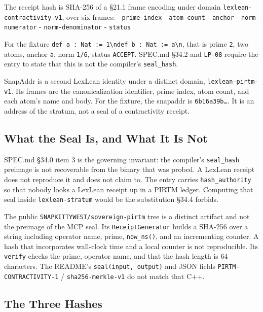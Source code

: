 \documentclass[
]{article}
\begin{document}
The receipt hash is SHA-256 of a §21.1 frame encoding under domain
\texttt{lexlean-contractivity-v1}, over six frames: -
\texttt{prime-index} - \texttt{atom-count} - \texttt{anchor} -
\texttt{norm-numerator} - \texttt{norm-denominator} - \texttt{status}

For the fixture
\texttt{def\ a\ :\ Nat\ :=\ 1\textbackslash{}ndef\ b\ :\ Nat\ :=\ a\textbackslash{}n},
that is prime \texttt{2}, two atoms, anchor \texttt{a}, norm
\texttt{1/6}, status \texttt{ACCEPT}. SPEC.md §34.2 and \texttt{LP-08}
require the entry to state that this is not the compiler's
\texttt{seal\_hash}.

SnapAddr is a second LexLean identity under a distinct domain,
\texttt{lexlean-pirtm-v1}. Its frames are the canonicalization
identifier, prime index, atom count, and each atom's name and body. For
the fixture, the snapaddr is \texttt{6b16a39b…}. It is an address of the
stratum, not a seal of a contractivity receipt.

\hypertarget{what-the-seal-is-and-what-it-is-not}{%
\subsection{What the Seal Is, and What It Is
Not}\label{what-the-seal-is-and-what-it-is-not}}

SPEC.md §34.0 item 3 is the governing invariant: the compiler's
\texttt{seal\_hash} preimage is not recoverable from the binary that was
probed. A LexLean receipt does not reproduce it and does not claim to.
The entry carries \texttt{hash\_authority} so that nobody looks a
LexLean receipt up in a PIRTM ledger. Computing that seal inside
\texttt{lexlean-stratum} would be the substitution §34.4 forbids.

The public \texttt{SNAPKITTYWEST/sovereign-pirtm} tree is a distinct
artifact and not the preimage of the MCP seal. Its
\texttt{ReceiptGenerator} builds a SHA-256 over a string including
operator name, prime, \texttt{now\_ns()}, and an incrementing counter. A
hash that incorporates wall-clock time and a local counter is not
reproducible. Its \texttt{verify} checks the prime, operator name, and
that the hash length is 64 characters. The README's
\texttt{seal(input,\ output)} and JSON fields
\texttt{PIRTM-CONTRACTIVITY-1} / \texttt{sha256-merkle-v1} do not match
that C++.

\hypertarget{the-three-hashes}{%
\subsection{The Three Hashes}\label{the-three-hashes}}
\end{document}
